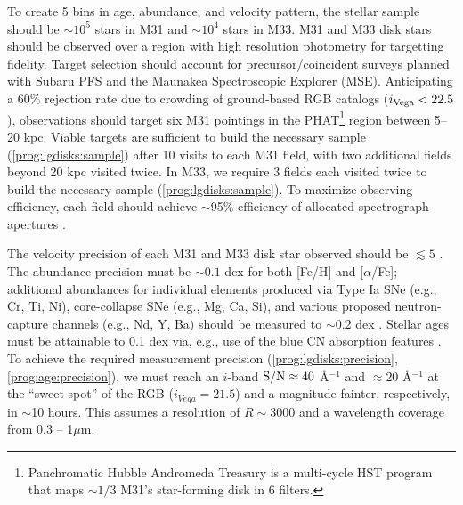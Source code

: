 \documentclass[11pt,a4paper,twoside,onecolumn,openany,final,oldfontcommands]{memoir}
\begin{document}
\begin{programrequirement}
\reqitem To create 5 bins in age, abundance, and velocity pattern, the stellar sample should be $\sim 10^5$ stars in M31 and $\sim 10^4$ stars in M33. \label{prog:lgdisks:sample}
\reqitem M31 and M33 disk stars should be observed over a region with high resolution photometry for targetting fidelity.
\reqitem Target selection should account for precursor/coincident surveys planned with Subaru PFS and the Maunakea Spectroscopic Explorer (MSE).
\reqitem Anticipating a 60\% rejection rate \citep{dorman12} due to crowding of ground-based RGB catalogs ($i_{\rm Vega} < 22.5$), observations should target six M31 pointings in the PHAT\footnote{Panchromatic Hubble Andromeda Treasury \citep{phat} is a multi-cycle HST program that maps $\sim1/3$ M31's star-forming disk in 6 filters.} region between 5--20 kpc.  Viable targets are sufficient to build the necessary sample (\ref{prog:lgdisks:sample}) after 10 visits to each M31 field, with two additional fields beyond 20 kpc visited twice.
\reqitem In M33, we require 3 fields each visited twice to build the necessary sample (\ref{prog:lgdisks:sample}).
\reqitem To maximize observing efficiency, each field should achieve $\sim$95\% efficiency of allocated spectrograph apertures .
\end{programrequirement}

\begin{sciencerequirement}
\reqitem The velocity precision of each M31 and M33 disk star observed should be $\lesssim 5$ \kms.
\reqitem The abundance precision must be $\sim 0.1$ dex for both [Fe/H] and [$\alpha$/Fe]; additional abundances for individual elements produced via Type Ia SNe (e.g., Cr, Ti, Ni), core-collapse SNe (e.g., Mg, Ca, Si), and various proposed neutron-capture channels (e.g., Nd, Y, Ba) should be measured to $\sim$0.2 dex \citep[Fig.~\ref{fig:abundances_snr}; cf.][]{Sandford20}. \label{prog:lgdisks:precision}
\reqitem Stellar ages must be attainable to 0.1 dex via, e.g., use of the blue CN absorption features \citep[e.g.][]{Martig16,Ting19}.  %
\label{prog:age:precision}
\reqitem To achieve the required measurement precision (\ref{prog:lgdisks:precision}, \ref{prog:age:precision}), we must reach an $i$-band ${\rm S/N} \approx 40$ \AA$^{-1}$ and $\approx 20$ \AA$^{-1}$ at the  ``sweet-spot'' of the RGB ($i_{Vega} = 21.5$) and a magnitude fainter, respectively, in $\sim$10 hours.  This assumes a resolution of $R\sim3000$ and a wavelength coverage from 0.3 -- 1$\mu$m.
\end{sciencerequirement}
\end{document}
